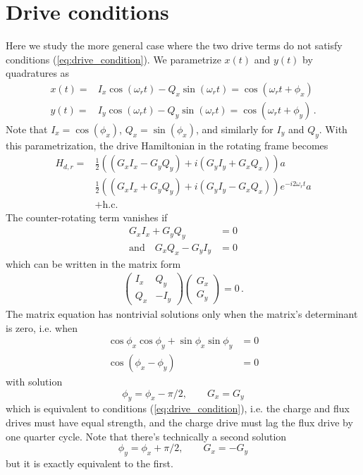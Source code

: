 \section{Drive conditions} \label{appendix:drive_conditions}

Here we study the more general case where the two drive terms do not satisfy conditions (\ref{eq:drive_condition}).
We parametrize $x(t)$ and $y(t)$ by quadratures as
\begin{align*}
  x(t) =& I_x \cos(\omega_r t) - Q_x \sin(\omega_r t) = \cos(\omega_r t + \phi_x) \\
  y(t) =& I_y \cos(\omega_r t) - Q_y \sin(\omega_r t) = \cos(\omega_r t + \phi_y)
  \, .
\end{align*}
Note that $I_x = \cos(\phi_x)$, $Q_x = \sin(\phi_x)$, and similarly for $I_y$ and $Q_y$.
With this parametrization, the drive Hamiltonian in the rotating frame becomes
\begin{align*}
  H_{d,r}
  =& \frac{1}{2}
  \left( (G_x I_x - G_y Q_y) + i (G_y I_y + G_x Q_x) \right) a \nonumber \\
  & \frac{1}{2}
  \left( (G_x I_x + G_y Q_y) + i (G_y I_y - G_x Q_x) \right) e^{-i 2 \omega_r t} a \nonumber \\
  & + \text{h.c.}
\end{align*}
The counter-rotating term vanishes if
\begin{align}
  G_x I_x + G_y Q_y &= 0 \nonumber \\
  \text{and} \quad
  G_x Q_x - G_y I_y &= 0
\end{align}
which can be written in the matrix form
\begin{align*}
  \begin{pmatrix}
    I_x & Q_y \\
    Q_x & -I_y
  \end{pmatrix} \begin{pmatrix}
    G_x \\ G_y
  \end{pmatrix}
  = 0
  \, .
\end{align*}
The matrix equation has nontrivial solutions only when the matrix's determinant is zero, i.e. when
\begin{align*}
  \cos\phi_x \cos\phi_y + \sin\phi_x \sin\phi_y &= 0 \\
  \cos(\phi_x - \phi_y) &= 0
\end{align*}
with solution
\begin{equation*}
  \phi_y = \phi_x - \pi/2, \qquad G_x = G_y
\end{equation*}
which is equivalent to conditions (\ref{eq:drive_condition}), i.e. the charge and flux drives must have equal strength, and the charge drive must lag the flux drive by one quarter cycle.
Note that there's technically a second solution
\begin{equation*}
  \phi_y = \phi_x + \pi/2, \qquad G_x = -G_y
\end{equation*}
but it is exactly equivalent to the first.
